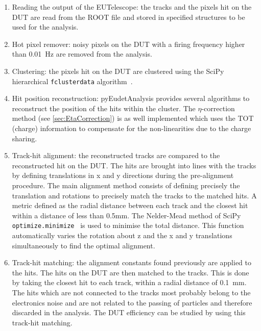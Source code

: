 \begin{enumerate}
\item Reading the output of the EUTelescope: the tracks and the pixels
  hit on the DUT are read from the ROOT file and stored in specified
  structures to be used for the analysis.

\item Hot pixel remover: noisy pixels on the DUT with a firing
  frequency higher than 0.01~Hz are removed from the analysis.

\item Clustering: the pixels hit on the DUT are clustered using the
  SciPy hierarchical \texttt{fclusterdata}
  algorithm~\cite{scipyClustering}.

\item Hit position reconstruction: pyEudetAnalysis provides several
  algorithms to reconstruct the position of the hits within the
  cluster. The $\eta$-correction method (see \cref{sec:EtaCorrection})
  is as well implemented which uses the TOT (charge) information to
  compensate for the non-linearities due to the charge sharing.

\item Track-hit alignment: the reconstructed tracks are compared to
  the reconstructed hit on the DUT. The hits are brought into lines
  with the tracks by defining translations in x and y directions
  during the pre-alignment procedure. The main alignment method
  consists of defining precisely the translation and rotations to
  precisely match the tracks to the matched hits. A metric defined as
  the radial distance between each track and the closest hit within a
  distance of less than 0.5mm. The Nelder-Mead method of SciPy
  \texttt{optimize.minimize}~\cite{SciPyOptimizeMinimize} is used to
  minimise the total distance. This function automatically varies the
  rotation about z and the x and y translations simultaneously to find
  the optimal alignment.

\item Track-hit matching: the alignment constants found previously are
  applied to the hits. The hits on the DUT are then matched to the
  tracks. This is done by taking the closest hit to each track, within
  a radial distance of 0.1~mm. The hits which are not connected to the
  tracks most probably belong to the electronics noise and are not
  related to the passing of particles and therefore discarded in the
  analysis. The DUT efficiency can be studied by using this track-hit
  matching.
\end{enumerate}
